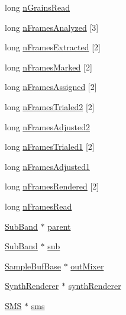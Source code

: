 \begin{DoxyCompactItemize}
\item 
long \hyperlink{class__sbsms___1_1_sub_band_afde42b420ea71cdc20c628e74f3f3698}{n\+Grains\+Read}
\item 
long \hyperlink{class__sbsms___1_1_sub_band_aca0eeb8204a9f8a51eb82d848f0fd2eb}{n\+Frames\+Analyzed} \mbox{[}3\mbox{]}
\item 
long \hyperlink{class__sbsms___1_1_sub_band_a79c56e48c1dc7760051c9ddff4401fd1}{n\+Frames\+Extracted} \mbox{[}2\mbox{]}
\item 
long \hyperlink{class__sbsms___1_1_sub_band_aa7e5db8cd143139a92f238c664e3b3f3}{n\+Frames\+Marked} \mbox{[}2\mbox{]}
\item 
long \hyperlink{class__sbsms___1_1_sub_band_a5911cf25796dd2d81a7f9842d1e868d6}{n\+Frames\+Assigned} \mbox{[}2\mbox{]}
\item 
long \hyperlink{class__sbsms___1_1_sub_band_adea573ff580db047a12746b977185636}{n\+Frames\+Trialed2} \mbox{[}2\mbox{]}
\item 
long \hyperlink{class__sbsms___1_1_sub_band_a1b959e104a308afc4a7444a968c2eb72}{n\+Frames\+Adjusted2}
\item 
long \hyperlink{class__sbsms___1_1_sub_band_a14e2c2793178a0c2ede77a2950a91cda}{n\+Frames\+Trialed1} \mbox{[}2\mbox{]}
\item 
long \hyperlink{class__sbsms___1_1_sub_band_af2f8e93eb7770756ba9aa778c1a81d17}{n\+Frames\+Adjusted1}
\item 
long \hyperlink{class__sbsms___1_1_sub_band_a458d065c8824c5e9a792a25922e951a7}{n\+Frames\+Rendered} \mbox{[}2\mbox{]}
\item 
long \hyperlink{class__sbsms___1_1_sub_band_a06474c8927ad9fc1079a3af45ef85f0f}{n\+Frames\+Read}
\item 
\hyperlink{class__sbsms___1_1_sub_band}{Sub\+Band} $\ast$ \hyperlink{class__sbsms___1_1_sub_band_a28e9b3ada3b1aa9a7d9b938de935568a}{parent}
\item 
\hyperlink{class__sbsms___1_1_sub_band}{Sub\+Band} $\ast$ \hyperlink{class__sbsms___1_1_sub_band_a1e1a1206dff7e31fff824706ed967883}{sub}
\item 
\hyperlink{class__sbsms___1_1_sample_buf_base}{Sample\+Buf\+Base} $\ast$ \hyperlink{class__sbsms___1_1_sub_band_a7abca964a57ef44320053c850ad57803}{out\+Mixer}
\item 
\hyperlink{class__sbsms___1_1_synth_renderer}{Synth\+Renderer} $\ast$ \hyperlink{class__sbsms___1_1_sub_band_a2f671c875a6dd97967ad97e40c3cab8c}{synth\+Renderer}
\item 
\hyperlink{class__sbsms___1_1_s_m_s}{S\+MS} $\ast$ \hyperlink{class__sbsms___1_1_sub_band_a67f4ce6733402c5a3edcf4075d99fe9e}{sms}

\end{DoxyCompactItemize}
